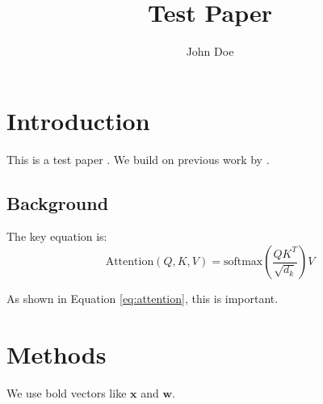 \documentclass{article}
\title{Test Paper}
\author{John Doe}
\begin{document}
\maketitle

\section{Introduction}

This is a test paper \cite{smith2020attention}. We build on previous work by \cite{vaswani2017transformer}.

\subsection{Background}

The key equation is:
\begin{equation}
\label{eq:attention}
\text{Attention}(Q, K, V) = \text{softmax}\left(\frac{QK^T}{\sqrt{d_k}}\right)V
\end{equation}

As shown in Equation \ref{eq:attention}, this is important.

\section{Methods}

We use bold vectors like $\boldsymbol{x}$ and $\mathbf{w}$.


\end{document}
